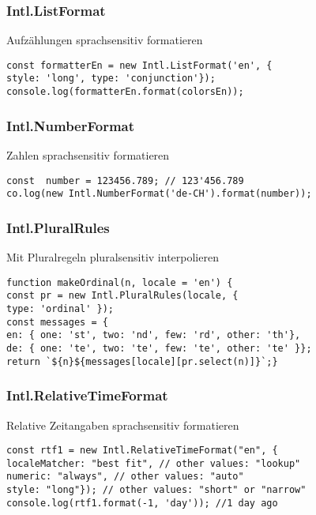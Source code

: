 \subsubsection{Intl.ListFormat}
Aufzählungen sprachsensitiv formatieren
\begin{lstlisting}
const formatterEn = new Intl.ListFormat('en', {
style: 'long', type: 'conjunction'});
console.log(formatterEn.format(colorsEn));
\end{lstlisting}

\subsubsection{Intl.NumberFormat}
Zahlen sprachsensitiv formatieren
\begin{lstlisting}
const  number = 123456.789; // 123'456.789
co.log(new Intl.NumberFormat('de-CH').format(number));
\end{lstlisting}

\subsubsection{Intl.PluralRules}
Mit Pluralregeln pluralsensitiv interpolieren
\begin{lstlisting}
function makeOrdinal(n, locale = 'en') {
const pr = new Intl.PluralRules(locale, {
type: 'ordinal' });
const messages = {
en: { one: 'st', two: 'nd', few: 'rd', other: 'th'},
de: { one: 'te', two: 'te', few: 'te', other: 'te' }};
return `${n}${messages[locale][pr.select(n)]}`;}
\end{lstlisting}

\subsubsection{Intl.RelativeTimeFormat}
Relative Zeitangaben sprachsensitiv formatieren
\begin{lstlisting}
const rtf1 = new Intl.RelativeTimeFormat("en", {
localeMatcher: "best fit", // other values: "lookup"
numeric: "always", // other values: "auto"
style: "long"}); // other values: "short" or "narrow"
console.log(rtf1.format(-1, 'day')); //1 day ago
\end{lstlisting}



\vfill


\columnbreak